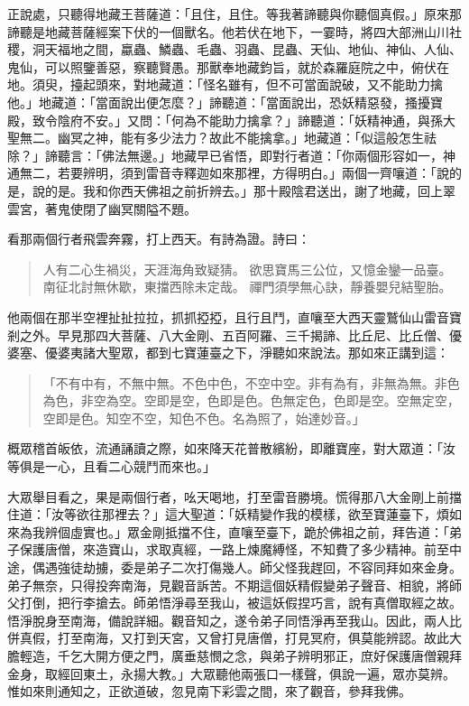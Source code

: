 正說處，只聽得地藏王菩薩道：「且住，且住。等我著諦聽與你聽個真假。」原來那諦聽是地藏菩薩經案下伏的一個獸名。他若伏在地下，一霎時，將四大部洲山川社稷，洞天福地之間，蠃蟲、鱗蟲、毛蟲、羽蟲、昆蟲、天仙、地仙、神仙、人仙、鬼仙，可以照鑒善惡，察聽賢愚。那獸奉地藏鈞旨，就於森羅庭院之中，俯伏在地。須臾，擡起頭來，對地藏道：「怪名雖有，但不可當面說破，又不能助力擒他。」地藏道：「當面說出便怎麼？」諦聽道：「當面說出，恐妖精惡發，搔擾寶殿，致令陰府不安。」又問：「何為不能助力擒拿？」諦聽道：「妖精神通，與孫大聖無二。幽冥之神，能有多少法力？故此不能擒拿。」地藏道：「似這般怎生祛除？」諦聽言：「佛法無邊。」地藏早已省悟，即對行者道：「你兩個形容如一，神通無二，若要辨明，須到雷音寺釋迦如來那裡，方得明白。」兩個一齊嚷道：「說的是，說的是。我和你西天佛祖之前折辨去。」那十殿陰君送出，謝了地藏，回上翠雲宮，著鬼使閉了幽冥關隘不題。

看那兩個行者飛雲奔霧，打上西天。有詩為證。詩曰：
\begin{quote}
人有二心生禍災，天涯海角致疑猜。
欲思寶馬三公位，又憶金鑾一品臺。
南征北討無休歇，東擋西除未定哉。
禪門須學無心訣，靜養嬰兒結聖胎。
\end{quote}

他兩個在那半空裡扯扯拉拉，抓抓掗掗，且行且鬥，直嚷至大西天靈鷲仙山雷音寶剎之外。早見那四大菩薩、八大金剛、五百阿羅、三千揭諦、比丘尼、比丘僧、優婆塞、優婆夷諸大聖眾，都到七寶蓮臺之下，淨聽如來說法。那如來正講到這：
\begin{quote}
「不有中有，不無中無。不色中色，不空中空。非有為有，非無為無。非色為色，非空為空。空即是空，色即是色。色無定色，色即是空。空無定空，空即是色。知空不空，知色不色。名為照了，始達妙音。」
\end{quote}

概眾稽首皈依，流通誦讀之際，如來降天花普散繽紛，即離寶座，對大眾道：「汝等俱是一心，且看二心競鬥而來也。」

大眾舉目看之，果是兩個行者，吆天喝地，打至雷音勝境。慌得那八大金剛上前擋住道：「汝等欲往那裡去？」這大聖道：「妖精變作我的模樣，欲至寶蓮臺下，煩如來為我辨個虛實也。」眾金剛抵擋不住，直嚷至臺下，跪於佛祖之前，拜告道：「弟子保護唐僧，來造寶山，求取真經，一路上煉魔縛怪，不知費了多少精神。前至中途，偶遇強徒劫擄，委是弟子二次打傷幾人。師父怪我趕回，不容同拜如來金身。弟子無奈，只得投奔南海，見觀音訴苦。不期這個妖精假變弟子聲音、相貌，將師父打倒，把行李搶去。師弟悟淨尋至我山，被這妖假捏巧言，說有真僧取經之故。悟淨脫身至南海，備說詳細。觀音知之，遂令弟子同悟淨再至我山。因此，兩人比併真假，打至南海，又打到天宮，又曾打見唐僧，打見冥府，俱莫能辨認。故此大膽輕造，千乞大開方便之門，廣垂慈憫之念，與弟子辨明邪正，庶好保護唐僧親拜金身，取經回東土，永揚大教。」大眾聽他兩張口一樣聲，俱說一遍，眾亦莫辨。惟如來則通知之，正欲道破，忽見南下彩雲之間，來了觀音，參拜我佛。

